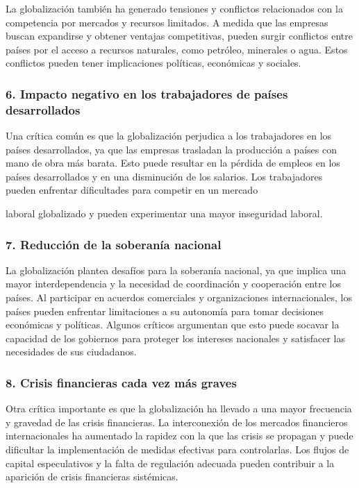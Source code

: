 \documentclass[
  jou,
  floatsintext,
  longtable,
  a4paper,
  nolmodern,
  notxfonts,
  notimes,
  12pt,
  colorlinks=true,linkcolor=blue,citecolor=blue,urlcolor=blue]{apa7}
\begin{document}
La globalización también ha generado tensiones y conflictos relacionados
con la competencia por mercados y recursos limitados. A medida que las
empresas buscan expandirse y obtener ventajas competitivas, pueden
surgir conflictos entre países por el acceso a recursos naturales, como
petróleo, minerales o agua. Estos conflictos pueden tener implicaciones
políticas, económicas y sociales.

\subsubsection{6. Impacto negativo en los trabajadores de países
desarrollados}\label{impacto-negativo-en-los-trabajadores-de-pauxedses-desarrollados}

Una crítica común es que la globalización perjudica a los trabajadores
en los países desarrollados, ya que las empresas trasladan la producción
a países con mano de obra más barata. Esto puede resultar en la pérdida
de empleos en los países desarrollados y en una disminución de los
salarios. Los trabajadores pueden enfrentar dificultades para competir
en un mercado

laboral globalizado y pueden experimentar una mayor inseguridad laboral.

\subsubsection{7. Reducción de la soberanía
nacional}\label{reducciuxf3n-de-la-soberanuxeda-nacional}

La globalización plantea desafíos para la soberanía nacional, ya que
implica una mayor interdependencia y la necesidad de coordinación y
cooperación entre los países. Al participar en acuerdos comerciales y
organizaciones internacionales, los países pueden enfrentar limitaciones
a su autonomía para tomar decisiones económicas y políticas. Algunos
críticos argumentan que esto puede socavar la capacidad de los gobiernos
para proteger los intereses nacionales y satisfacer las necesidades de
sus ciudadanos.

\subsubsection{8. Crisis financieras cada vez más
graves}\label{crisis-financieras-cada-vez-muxe1s-graves}

Otra crítica importante es que la globalización ha llevado a una mayor
frecuencia y gravedad de las crisis financieras. La interconexión de los
mercados financieros internacionales ha aumentado la rapidez con la que
las crisis se propagan y puede dificultar la implementación de medidas
efectivas para controlarlas. Los flujos de capital especulativos y la
falta de regulación adecuada pueden contribuir a la aparición de crisis
financieras sistémicas.
\end{document}
